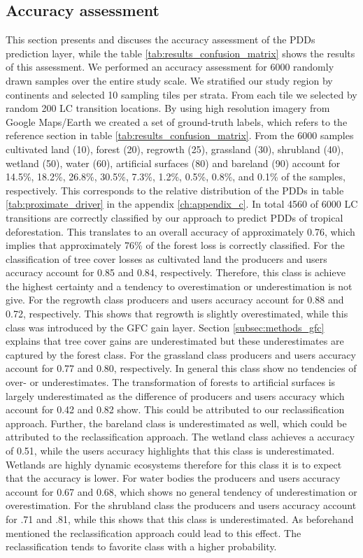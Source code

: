 		\subsection{Accuracy assessment}
		\label{subsec:results_accuracy_assessment}
			This section presents and discuses the accuracy assessment of the \acp{PDD} prediction layer, while the table \ref{tab:results_confusion_matrix} shows the results of this assessment. We performed an accuracy assessment for 6000 randomly drawn samples over the entire study scale. We stratified our study region by continents and selected 10 sampling tiles per strata. From each tile we selected by random 200 \ac{LC} transition locations. By using high resolution imagery from Google Maps/Earth we created a set of ground-truth labels, which refers to the reference section in table \ref{tab:results_confusion_matrix}. From the 6000 samples cultivated land (10), forest (20), regrowth (25), grassland (30), shrubland (40), wetland (50), water (60), artificial surfaces (80) and bareland (90) account for 14.5\%, 18.2\%, 26.8\%, 30.5\%, 7.3\%, 1.2\%, 0.5\%, 0.8\%, and 0.1\% of the samples, respectively. This corresponds to the relative distribution of the  \acp{PDD} in table \ref{tab:proximate_driver} in the appendix \ref{ch:appendix_c}. In total 4560 of 6000 \ac{LC} transitions are correctly classified by our approach to predict \acp{PDD} of tropical deforestation. This translates to an overall accuracy of approximately 0.76, which implies that approximately 76\% of the forest loss is correctly classified. For the classification of tree cover losses as cultivated land the producers and users accuracy account for 0.85 and 0.84, respectively. Therefore, this class is achieve the highest certainty and a tendency to overestimation or underestimation is not give. For the regrowth class producers and users accuracy account for 0.88 and 0.72, respectively. This shows that regrowth is slightly overestimated, while this class was introduced by the \ac{GFC} gain layer. Section \ref{subsec:methods_gfc} explains that tree cover gains are underestimated but these underestimates are captured by the forest class. 
			For the grassland class producers and users accuracy account for 0.77 and 0.80, respectively. In general this class show no tendencies of over- or underestimates. The transformation of forests to artificial surfaces is largely underestimated as the difference of producers and users accuracy which account for 0.42 and 0.82 show. This could be attributed to our reclassification approach. Further, the bareland class is underestimated as well, which could be attributed to the reclassification approach. The wetland class achieves a accuracy of 0.51, while the users accuracy highlights that this class is underestimated. Wetlands are highly dynamic ecosystems therefore for this class it is to expect that the accuracy is lower. For water bodies the producers and users accuracy account for 0.67 and 0.68, which shows no general tendency of underestimation or overestimation. For the shrubland class the producers and users accuracy account for  .71 and .81, while this shows that this class is underestimated. As beforehand mentioned the reclassification approach could lead to this effect. The reclassification tends to favorite class with a higher probability. 
